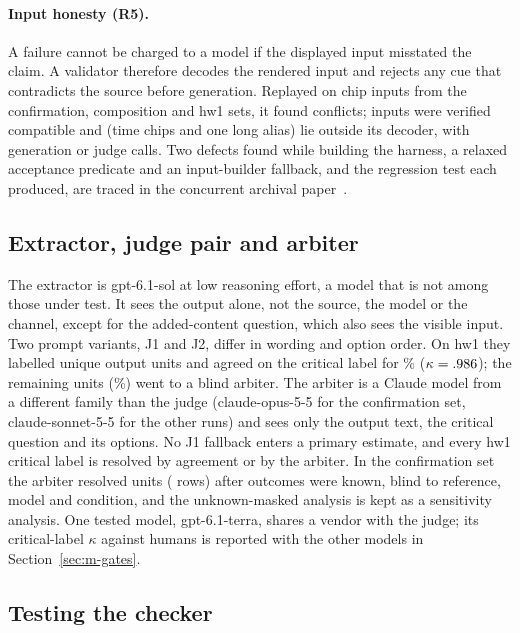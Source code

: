 \paragraph{Input honesty (R5).}
A failure cannot be charged to a model if the displayed input misstated the claim.
A validator therefore decodes the rendered input and rejects any cue that contradicts the source before generation.
Replayed on \jmtNineInputs{} chip inputs from the confirmation, composition and hw1 sets, it found \jmtNineConflicts{} conflicts; \jmtNineCompat{} inputs were verified compatible and \jmtNineUnknown{} (time chips and one long alias) lie outside its decoder, with \jmtNineGenCalls{} generation or judge calls.
Two defects found while building the harness, a relaxed acceptance predicate and an input-builder fallback, and the regression test each produced, are traced in the concurrent archival paper~\cite{concurrent_se4all}.

\subsection{Extractor, judge pair and arbiter}\label{sec:m-judge}

The extractor is gpt-6.1-sol at low reasoning effort, a model that is not among those under test.
It sees the output alone, not the source, the model or the channel, except for the added-content question, which also sees the visible input.
Two prompt variants, J1 and J2, differ in wording and option order.
On hw1 they labelled \jmhwUnits{} unique output units and agreed on the critical label for \jmhwJJCrit{}\% ($\kappa=.986{}$); the remaining \jmhwNeedArb{} units (\jmhwNeedArbShare{}\%) went to a blind arbiter.
The arbiter is a Claude model from a different family than the judge (claude-opus-5-5 for the confirmation set, claude-sonnet-5-5 for the other runs) and sees only the output text, the critical question and its options.
No J1 fallback enters a primary estimate, and every hw1 critical label is resolved by agreement or by the arbiter.
In the confirmation set the arbiter resolved \jmwcArbUnits{} units (\jmwcArbRows{} rows) after outcomes were known, blind to reference, model and condition, and the unknown-masked analysis is kept as a sensitivity analysis.
One tested model, gpt-6.1-terra, shares a vendor with the judge; its critical-label $\kappa$ against humans is reported with the other models in Section~\ref{sec:m-gates}.

\subsection{Testing the checker}\label{sec:m-oracle}

